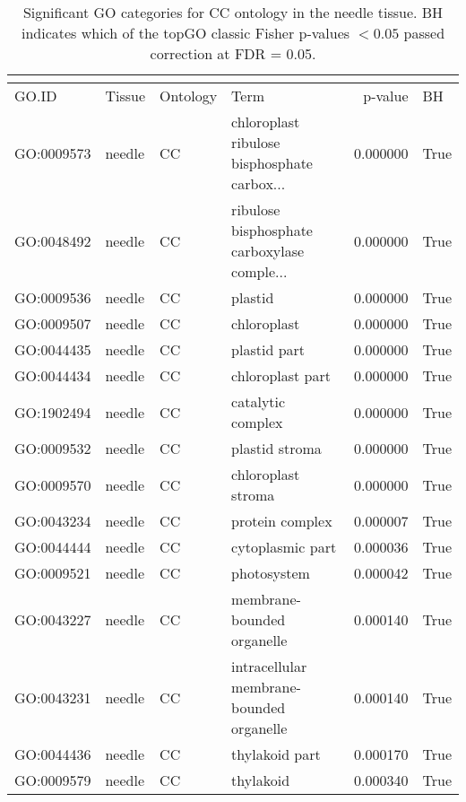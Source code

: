 \begin{longtable}{llllrl}
\caption{Significant GO categories for CC ontology in the needle tissue. BH indicates which of the topGO classic Fisher p-values $< 0.05$ passed correction at FDR = 0.05.}\\
\label{tab:go-needle-CC}\\
\toprule
GO.ID & Tissue & Ontology & Term & p-value & BH \\
\midrule
GO:0009573 & needle & CC &   chloroplast ribulose bisphosphate carbox...  & 0.000000 &    True \\
GO:0048492 & needle & CC &   ribulose bisphosphate carboxylase comple...  & 0.000000 &    True \\
GO:0009536 & needle & CC &                                       plastid  & 0.000000 &    True \\
GO:0009507 & needle & CC &                                   chloroplast  & 0.000000 &    True \\
GO:0044435 & needle & CC &                                  plastid part  & 0.000000 &    True \\
GO:0044434 & needle & CC &                              chloroplast part  & 0.000000 &    True \\
GO:1902494 & needle & CC &                             catalytic complex  & 0.000000 &    True \\
GO:0009532 & needle & CC &                                plastid stroma  & 0.000000 &    True \\
GO:0009570 & needle & CC &                            chloroplast stroma  & 0.000000 &    True \\
GO:0043234 & needle & CC &                               protein complex  & 0.000007 &    True \\
GO:0044444 & needle & CC &                              cytoplasmic part  & 0.000036 &    True \\
GO:0009521 & needle & CC &                                   photosystem  & 0.000042 &    True \\
GO:0043227 & needle & CC &                    membrane-bounded organelle  & 0.000140 &    True \\
GO:0043231 & needle & CC &      intracellular membrane-bounded organelle  & 0.000140 &    True \\
GO:0044436 & needle & CC &                                thylakoid part  & 0.000170 &    True \\
GO:0009579 & needle & CC &                                     thylakoid  & 0.000340 &    True \\

\end{longtable}
